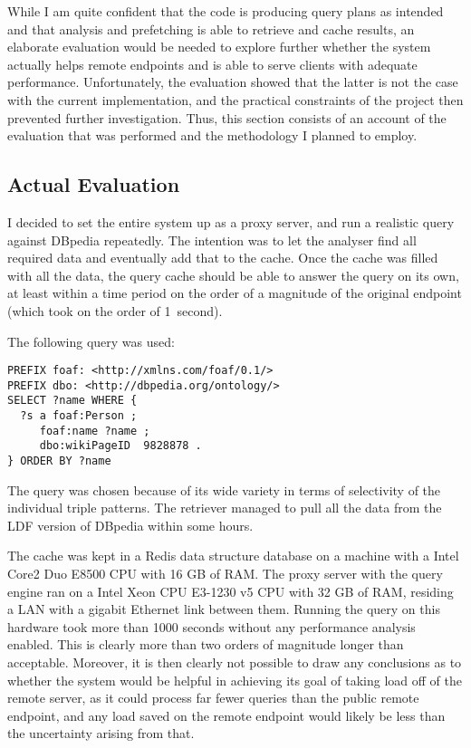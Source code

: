 While I am quite confident that the code is producing query plans as
intended and that analysis and prefetching is able to retrieve and
cache results, an elaborate evaluation would be needed to explore
further whether the system actually helps remote endpoints and is able
to serve clients with adequate performance. Unfortunately, the
evaluation showed that the latter is not the case with the current
implementation, and the practical constraints of the project then
prevented further investigation. Thus, this section consists of an
account of the evaluation that was performed and the methodology I
planned to employ.

\subsection{Actual Evaluation}

I decided to set the entire system up as a proxy server, and run a
realistic query against DBpedia repeatedly. The intention was to let
the analyser find all required data and eventually add that to the
cache. Once the cache was filled with all the data, the query cache
should be able to answer the query on its own, at least within a time
period on the order of a magnitude of the original endpoint (which
took on the order of 1~second). 

The following query was used:

\begin{verbatim}
PREFIX foaf: <http://xmlns.com/foaf/0.1/>
PREFIX dbo: <http://dbpedia.org/ontology/>
SELECT ?name WHERE {
  ?s a foaf:Person ;
     foaf:name ?name ;
     dbo:wikiPageID  9828878 .
} ORDER BY ?name
\end{verbatim}

The query was chosen because of its wide variety in terms of
selectivity of the individual triple patterns. The retriever managed
to pull all the data from the LDF version of DBpedia
within some hours. 

The cache was kept in a Redis data structure database on a machine
with a Intel Core2 Duo E8500 CPU with 16 GB of RAM. The proxy server
with the query engine ran on a Intel Xeon CPU E3-1230 v5 CPU with 32
GB of RAM, residing a LAN with a gigabit Ethernet link between
them. Running the query on this hardware took more than 1000 seconds
without any performance analysis enabled. This is clearly more than
two orders of magnitude longer than acceptable. Moreover, it is then
clearly not possible to draw any conclusions as to whether the system
would be helpful in achieving its goal of taking load off of the
remote server, as it could process far fewer queries than the public
remote endpoint, and any load saved on the remote endpoint would
likely be less than the uncertainty arising from that.

